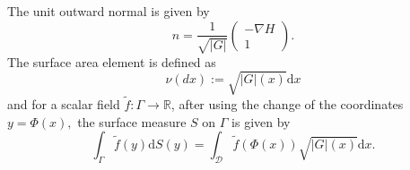 \documentclass[11pt, a4paper]{article}
\newcommand{\mathd}{\mathrm{d}}
\begin{document}
The unit outward normal is given by
\begin{equation*}
    n = \frac{1}{\sqrt{ | G |}} 
\begin{pmatrix} 
     - \nabla H\\
     1
\end{pmatrix}.
\end{equation*}
The surface area element is defined as 
\begin{equation}\label{def:nu}
    \nu(dx):=\sqrt{|G|(x)} \mathd x 
\end{equation}
and   for a scalar field $\tilde{f} : \Gamma \rightarrow \mathbb{R}$, after
using the change of the coordinates $y = \Phi (x),$ the surface measure $S$ on $\Gamma$ is given by
\begin{equation}\label{partial_int}
  \int_{\Gamma} \tilde{f} (y) {\mathd S} (y) = \int_\mathcal{D} \tilde{f} (\Phi (x)) \sqrt{ | G | (x)}
  {\mathd x}.
\end{equation}
\end{document}
